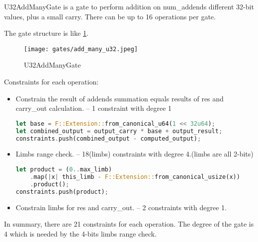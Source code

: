 
\hspace*{\fill}

\indent U32AddManyGate is a gate to perform addition on num\_addends different 32-bit values, plus a small carry. 
There can be up to 16 operations per gate.

The gate structure is like \ref{fig:add-many-u32}.

\begin{figure}[!ht]
    \centering
    \texttt{[image: gates/add\_many\_u32.jpeg]}
    \caption{U32AddManyGate}
    \label{fig:add-many-u32}
\end{figure}

Constraints for each operation:
\begin{itemize}
    \item Constrain the result of addends summation equals results of res and carry\_out calculation. -- 1 constraint with degree 1
    \begin{lstlisting}[language=rust]
let base = F::Extension::from_canonical_u64(1 << 32u64);
let combined_output = output_carry * base + output_result;
constraints.push(combined_output - computed_output);
    \end{lstlisting}
    \item Limbs range check. -- 18(limbs) constraints with degree 4.(limbs are all 2-bits)
    \begin{lstlisting}[language=rust]
let product = (0..max_limb)
    .map(|x| this_limb - F::Extension::from_canonical_usize(x))
    .product();
constraints.push(product);
    \end{lstlisting}
    \item Constrain limbs for res and carry\_out. -- 2 constraints with degree 1.
\end{itemize}

In summary, there are 21 constraints for each operation. The degree of the gate is 4 which is needed by the 4-bits limbs range check.
